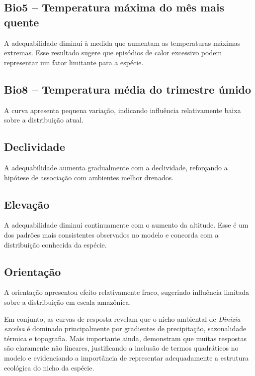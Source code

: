 \subsection*{Bio5 -- Temperatura máxima do mês mais quente}

A adequabilidade diminui à medida que aumentam as temperaturas máximas extremas. Esse resultado sugere que episódios de calor excessivo podem representar um fator limitante para a espécie.

\subsection*{Bio8 -- Temperatura média do trimestre úmido}

A curva apresenta pequena variação, indicando influência relativamente baixa sobre a distribuição atual.

\subsection*{Declividade}

A adequabilidade aumenta gradualmente com a declividade, reforçando a hipótese de associação com ambientes melhor drenados.

\subsection*{Elevação}

A adequabilidade diminui continuamente com o aumento da altitude. Esse é um dos padrões mais consistentes observados no modelo e concorda com a distribuição conhecida da espécie.

\subsection*{Orientação}

A orientação apresentou efeito relativamente fraco, sugerindo influência limitada sobre a distribuição em escala amazônica.

Em conjunto, as curvas de resposta revelam que o nicho ambiental de \textit{Dinizia excelsa} é dominado principalmente por gradientes de precipitação, sazonalidade térmica e topografia. Mais importante ainda, demonstram que muitas respostas são claramente não lineares, justificando a inclusão de termos quadráticos no modelo e evidenciando a importância de representar adequadamente a estrutura ecológica do nicho da espécie.


